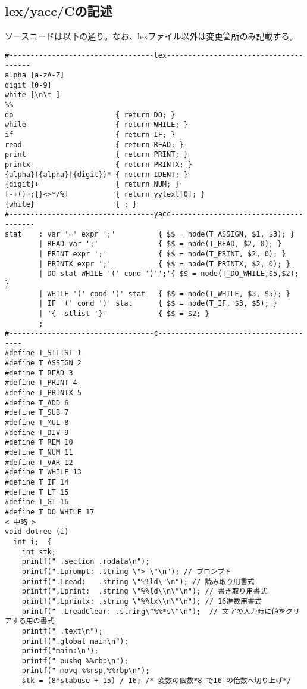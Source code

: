 \documentclass[a4paper,11pt]{jarticle}
\begin{document}
\subsection{lex/yacc/Cの記述}
ソースコードは以下の通り。なお、lexファイル以外は変更箇所のみ記載する。\\
\begin{verbatim}
#----------------------------------lex--------------------------------------
alpha [a-zA-Z]
digit [0-9]
white [\n\t ]
%%
do                        { return DO; }
while                     { return WHILE; }
if                        { return IF; }
read                      { return READ; }
print                     { return PRINT; }
printx                    { return PRINTX; }
{alpha}({alpha}|{digit})* { return IDENT; }
{digit}+                  { return NUM; }
[-+()=;{}<>*/%]           { return yytext[0]; }
{white}                   { ; }
#----------------------------------yacc--------------------------------------
stat    : var '=' expr ';'          { $$ = node(T_ASSIGN, $1, $3); }
        | READ var ';'              { $$ = node(T_READ, $2, 0); }
        | PRINT expr ';'            { $$ = node(T_PRINT, $2, 0); }
        | PRINTX expr ';'           { $$ = node(T_PRINTX, $2, 0); }
        | DO stat WHILE '(' cond ')'';'{ $$ = node(T_DO_WHILE,$5,$2); }
        | WHILE '(' cond ')' stat   { $$ = node(T_WHILE, $3, $5); }
        | IF '(' cond ')' stat      { $$ = node(T_IF, $3, $5); }
        | '{' stlist '}'            { $$ = $2; }
        ;
#----------------------------------c--------------------------------------
#define T_STLIST 1
#define T_ASSIGN 2
#define T_READ 3
#define T_PRINT 4
#define T_PRINTX 5
#define T_ADD 6
#define T_SUB 7
#define T_MUL 8
#define T_DIV 9
#define T_REM 10
#define T_NUM 11
#define T_VAR 12
#define T_WHILE 13
#define T_IF 14
#define T_LT 15
#define T_GT 16
#define T_DO_WHILE 17
< 中略 >
void dotree (i)
  int i;  {
    int stk;
    printf(" .section .rodata\n");
    printf(".Lprompt: .string \"> \"\n"); // プロンプト
    printf(".Lread:   .string \"%%ld\"\n"); // 読み取り用書式
    printf(".Lprint:  .string \"%%ld\\n\"\n"); // 書き取り用書式
    printf(".Lprintx: .string \"%%lx\\n\"\n"); // 16進数用書式
    printf(" .LreadClear: .string\"%%*s\"\n");  // 文字の入力時に値をクリアする用の書式
    printf(" .text\n");
    printf(".global main\n");
    printf("main:\n");
    printf(" pushq %%rbp\n");
    printf(" movq %%rsp,%%rbp\n");
    stk = (8*stabuse + 15) / 16; /* 変数の個数*8 で16 の倍数へ切り上げ*/

\end{verbatim}
\end{document}
